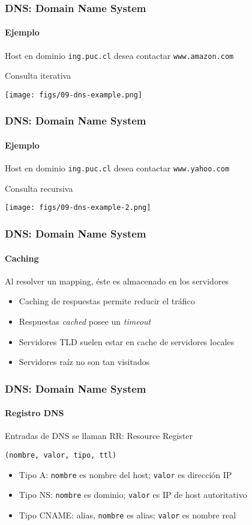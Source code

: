 \documentclass[letter]{beamer}
\begin{document}
\begin{frame}
  \frametitle{DNS: Domain Name System}
  \framesubtitle{Ejemplo}
  Host en dominio {\tt ing.puc.cl} desea contactar {\tt www.amazon.com}
  
  Consulta iterativa
  \begin{center}
    \texttt{[image: figs/09-dns-example.png]}
  \end{center}


\end{frame}
\begin{frame}
  \frametitle{DNS: Domain Name System}
  \framesubtitle{Ejemplo}

  Host en dominio {\tt ing.puc.cl} desea contactar {\tt www.yahoo.com}
  
  Consulta recursiva
  \begin{center}
    \texttt{[image: figs/09-dns-example-2.png]}
  \end{center}


\end{frame}
\begin{frame}
  \frametitle{DNS: Domain Name System}
  \framesubtitle{Caching}

  Al resolver un mapping, éste es almacenado en los servidores
  \begin{itemize}
    \item Caching de respuestas permite reducir el tráfico
    \item Respuestas {\em cached} posee un {\em timeout}
    \item Servidores TLD suelen estar en cache de servidores locales
    \item Servidores raíz no son tan visitados
  \end{itemize}

\end{frame}
\begin{frame}
  \frametitle{DNS: Domain Name System}
  \framesubtitle{Registro DNS}

  Entradas de DNS se llaman RR: Resource Register
  
  \begin{center}
    {\tt (nombre, valor, tipo, ttl)}
  \end{center}
  
  \begin{itemize}
    \item Tipo A: {\tt nombre} es nombre del host; {\tt valor} es dirección IP
    \item Tipo NS: {\tt nombre} es dominio; {\tt valor} es IP de host autoritativo
    \item Tipo CNAME: alias, {\tt nombre} es alias; {\tt valor} es nombre real
  \end{itemize}

\end{frame}
\end{document}
